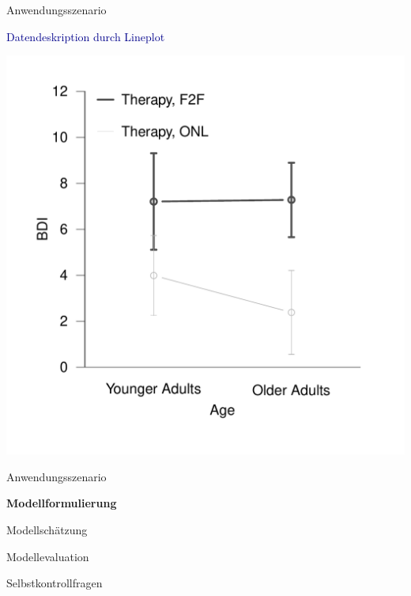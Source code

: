 \documentclass[
  8pt,
  ignorenonframetext,
]{beamer}
\begin{document}
\begin{frame}{Anwendungsszenario}
\protect\hypertarget{anwendungsszenario-12}{}
\vspace{2mm}

\textcolor{darkblue}{Datendeskription durch Lineplot}

\vspace{3mm}
\center

\begin{center}\includegraphics[width=0.6\linewidth]{11_Abbildungen/alm_11_zva_lineplot_beispiel} \end{center}
\end{frame}

\begin{frame}{}
\protect\hypertarget{section-5}{}
\large
{}
\vfill

Anwendungsszenario

\textbf{Modellformulierung}

Modellschätzung

Modellevaluation

Selbstkontrollfragen \vfill
\end{frame}
\end{document}

